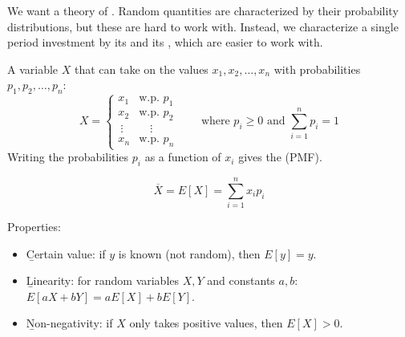 

We want a theory of . Random quantities are characterized by their probability distributions, but these are hard to work with. Instead, we characterize a single period investment by its  and its , which are easier to work with.

\begin{definition}
    A variable $X$ that can take on the values $x_1, x_2, \dots, x_n$ with probabilities $p_1, p_2, \dots, p_n$:
    \[X = \begin{cases}
        x_1 & \text{w.p. } p_1\\
        x_2 & \text{w.p. } p_2\\
        \ \vdots & \quad\vdots\\
        x_n & \text{w.p. } p_n
    \end{cases} \qquad \text{where } p_i \geq 0 \text{ and } \sum_{i=1}^{n}p_i = 1\]
    Writing the probabilities $p_i$ as a function of $x_i$ gives the  (PMF).
\end{definition}

\begin{center}
\end{center}

\begin{definition}[\rb{Expectation}]
    \[\boxed{\overline{X} = E[X] = \sum_{i=1}^{n}x_ip_i}\]
\end{definition}
Properties:
\begin{itemize}
    \item \b{Certain value}: if $y$ is known (not random), then $E[y] = y$.
    \item \b{Linearity}: for random variables $X, Y$ and constants $a, b$: $E[aX + bY] = aE[X] + bE[Y]$.
    \item \b{Non-negativity}: if $X$ only takes positive values, then $E[X] > 0$.
\end{itemize}

